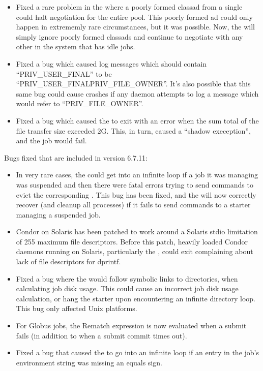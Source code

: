 \begin{itemize}

\item Fixed a rare problem in the  where a poorly
  formed classad from a single  could halt negotiation
  for the entire pool.
  This poorly formed ad could only happen in extrememly rare
  circumstances, but it was possible.
  Now, the  will simply ignore poorly formed
  classads and continue to negotiate with any other  in
  the system that has idle jobs.

\item Fixed a bug which caused log messages which should contain
  ``PRIV\_USER\_FINAL'' to be ``PRIV\_USER\_FINALPRIV\_FILE\_OWNER''.
  It's also possible that this same bug could cause crashes if any
  daemon attempts to log a message which would refer to
  ``PRIV\_FILE\_OWNER''.

\item Fixed a bug which caused the  to exit with an
  error when the sum total of the file transfer size exceeded 2G.
  This, in turn, caused a ``shadow exeception'', and the job would
  fail.

\end{itemize}


\noindent Bugs fixed that are included in version 6.7.11:

\begin{itemize}

\item In very rare cases, the  could get into an
infinite loop if a job it was managing was suspended and then there
were fatal errors trying to send commands to evict the corresponding
.
This bug has been fixed, and the  will now correctly
recover (and cleanup all processes) if it fails to send commands to a
starter managing a suspended job.

\item Condor on Solaris has been patched to work around a Solaris stdio
limitation of 255 maximum file descriptors.  Before this patch, heavily
loaded Condor daemons running on Solaris, particularly the ,
could exit complaining about lack of file descriptors for dprintf.

\item Fixed a bug where the  would follow symbolic links to
directories, when calculating job disk usage.  This could cause an incorrect
job disk usage calculation, or hang the starter upon encountering an infinite
directory loop.  This bug only affected Unix platforms.

\item For Globus jobs, the Rematch expression is now evaluated when a
submit fails (in addition to when a submit commit times out).

\item Fixed a bug that caused the  to go into an
infinite loop if an entry in the job's environment string was missing
an equals sign.

\end{itemize}

